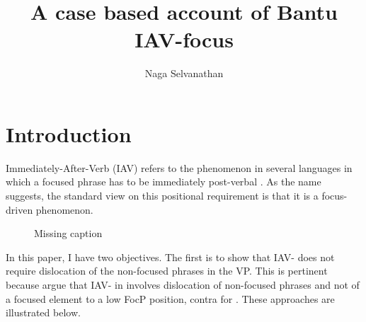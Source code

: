 \documentclass[output=paper,newtxmath,modfonts,nonflat,draft]{langsci/langscibook}
\title{A case based account of Bantu IAV-focus}
\author{Naga Selvanathan\affiliation{Rutgers University}}
\begin{document}
\maketitle
\section{Introduction}

 Immediately-After-Verb (IAV)  refers to the phenomenon in several  languages in which a focused phrase has to be immediately post-verbal \citep{hyman1979nounstructure,watters1979}. As the name suggests, the standard view on this positional requirement is that it is a focus-driven phenomenon. 

\begin{figure}
%
%
\caption{\color{red}Missing caption}
\label{fig:selvanathan:1}
\end{figure}


 In this paper, I have two objectives. The first is to show that  IAV- does not require dislocation of the non-focused phrases in the VP. This is pertinent because \citet{chengdowning2012} argue that IAV- in  involves dislocation of non-focused phrases and not  of a focused element to a low FocP position, contra \citet{vanderwal2006} for . These approaches are illustrated below.
\end{document}
